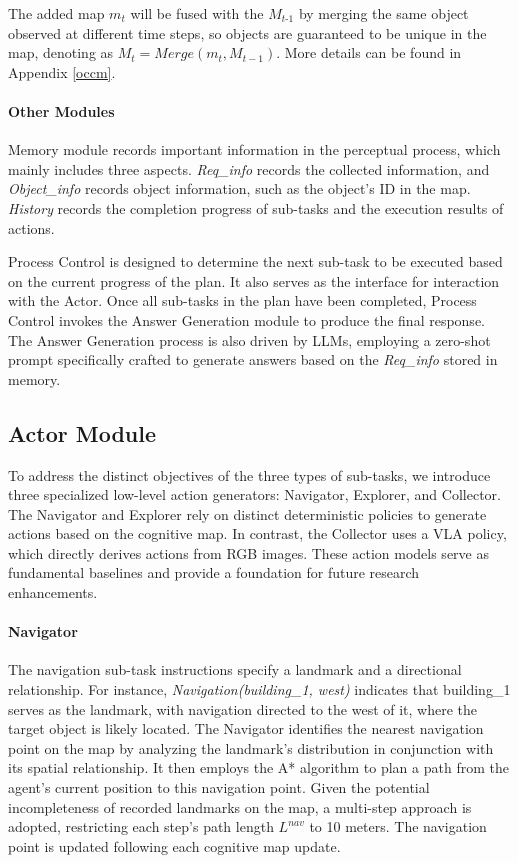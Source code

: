 The added map ${{m}_{t}}$ will be fused with the ${{M}_{t\text{-}1}}$ by merging the same object observed at different time steps, so objects are guaranteed to be unique in the map, denoting as ${{M}_{t}}=Merge({{m}_{t}},{{M}_{t-1}})$. More details can be found in Appendix \ref{occm}.

\paragraph{Other Modules}
Memory module records important information in the perceptual process, which mainly includes three aspects. \textit{Req\_info} records the collected information, and \textit{Object\_info} records object information, such as the object's ID in the map. \textit{History} records the completion progress of sub-tasks and the execution results of actions.

Process Control is designed to determine the next sub-task to be executed based on the current progress of the plan. It also serves as the interface for interaction with the Actor. Once all sub-tasks in the plan have been completed, Process Control invokes the Answer Generation module to produce the final response. The Answer Generation process is also driven by LLMs, employing a zero-shot prompt specifically crafted to generate answers based on the \textit{Req\_info} stored in memory.


\subsection{Actor Module}
To address the distinct objectives of the three types of sub-tasks, we introduce three specialized low-level action generators: Navigator, Explorer, and Collector. The Navigator and Explorer rely on distinct deterministic policies to generate actions based on the cognitive map. In contrast, the Collector uses a VLA policy, which directly derives actions from RGB images. These action models serve as fundamental baselines and provide a foundation for future research enhancements.

\paragraph{Navigator}
The navigation sub-task instructions specify a landmark and a directional relationship. For instance, \textit{Navigation(building\_1, west)} indicates that building\_1 serves as the landmark, with navigation directed to the west of it, where the target object is likely located. The Navigator identifies the nearest navigation point on the map by analyzing the landmark's distribution in conjunction with its spatial relationship. It then employs the A* algorithm to plan a path from the agent's current position to this navigation point. Given the potential incompleteness of recorded landmarks on the map, a multi-step approach is adopted, restricting each step's path length ${L^{nav}}$ to 10 meters. The navigation point is updated following each cognitive map update.

